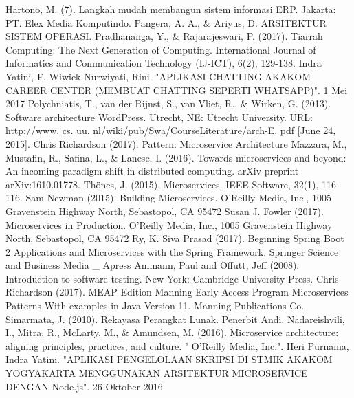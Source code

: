 
\begin{thebibliography}{7}

{Hartono, M. (7). Langkah mudah membangun sistem informasi ERP. Jakarta: PT. Elex Media Komputindo.}
{Pangera, A. A., \& Ariyus, D. ARSITEKTUR SISTEM OPERASI.}
{Pradhananga, Y., \& Rajarajeswari, P. (2017). Tiarrah Computing: The Next Generation of Computing. International Journal of Informatics and Communication Technology (IJ-ICT), 6(2), 129-138.}
{Indra Yatini, F. Wiwiek Nurwiyati, Rini. "APLIKASI CHATTING AKAKOM CAREER CENTER (MEMBUAT CHATTING SEPERTI WHATSAPP)". 1 Mei 2017}
{Polychniatis, T., van der Rijnst, S., van Vliet, R., \& Wirken, G. (2013). Software architecture WordPress. Utrecht, NE: Utrecht University. URL: http://www. cs. uu. nl/wiki/pub/Swa/CourseLiterature/arch-E. pdf [June 24, 2015].}
{Chris Richardson (2017). Pattern: Microservice Architecture}
{Mazzara, M., Mustafin, R., Safina, L., \& Lanese, I. (2016). Towards microservices and beyond: An incoming paradigm shift in distributed computing. arXiv preprint arXiv:1610.01778.}
{Thönes, J. (2015). Microservices. IEEE Software, 32(1), 116-116.}
{Sam Newman (2015). Building Microservices. O’Reilly Media, Inc., 1005 Gravenstein Highway North, Sebastopol, CA 95472}
{Susan J. Fowler (2017). Microservices in Production. O’Reilly Media, Inc., 1005 Gravenstein Highway North, Sebastopol, CA 95472}
{Ry, K. Siva Prasad (2017). Beginning Spring Boot 2 Applications and Microservices with the Spring Framework. Springer Science and Business Media \_ Apress}
{Ammann, Paul and Offutt, Jeff (2008). Introduction to software testing. New York: Cambridge University Press.}
{Chris Richardson (2017). MEAP Edition Manning Early Access Program Microservices Patterns With examples in Java Version 11. Manning Publications Co.}
{Simarmata, J. (2010). Rekayasa Perangkat Lunak. Penerbit Andi.}
{Nadareishvili, I., Mitra, R., McLarty, M., \& Amundsen, M. (2016). Microservice architecture: aligning principles, practices, and culture. " O'Reilly Media, Inc.".}
{Heri Purnama, Indra Yatini. "APLIKASI PENGELOLAAN SKRIPSI DI STMIK AKAKOM YOGYAKARTA MENGGUNAKAN ARSITEKTUR MICROSERVICE DENGAN Node.js". 26 Oktober 2016}
\end{thebibliography}
